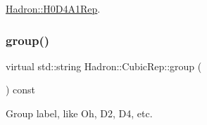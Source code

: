 \mbox{\hyperlink{structHadron_1_1H0D4A1Rep_abc2f3e6961a83aec1fdfa3909b4925dd}{Hadron\+::\+H0\+D4\+A1\+Rep}}.

\mbox{\label{structHadron_1_1CubicRep_a0748f11ec87f387062c8e8981339a29c}} 
\subsubsection{\texorpdfstring{group()}{group()}\hspace{0.1cm}{\footnotesize\ttfamily [2/2]}}
{\footnotesize\ttfamily virtual std\+::string Hadron\+::\+Cubic\+Rep\+::group (\begin{DoxyParamCaption}{ }\end{DoxyParamCaption}) const\hspace{0.3cm}{\ttfamily [pure virtual]}}

Group label, like Oh, D2, D4, etc. 

